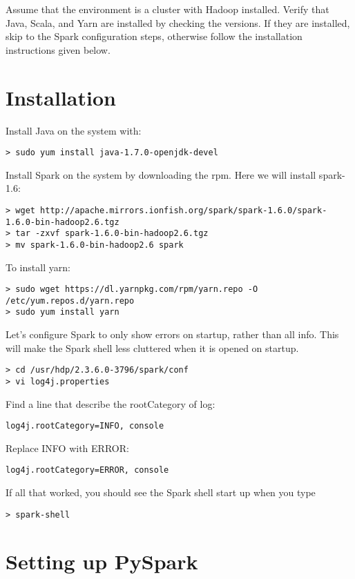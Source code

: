\documentclass[9pt,twocolumn,twoside]{idsi}
\begin{document}
Assume that the environment is a cluster with Hadoop installed. Verify that Java, Scala, and Yarn are installed by checking the versions. If they are installed, skip to the Spark configuration steps, otherwise follow the installation instructions given below.
\section{Installation}

\noindent
Install Java on the system with:
\begin{verbatim}
> sudo yum install java-1.7.0-openjdk-devel
\end{verbatim}

\noindent
Install Spark on the system by downloading the rpm. Here we will install spark-1.6:
\begin{lstlisting}[breaklines]
> wget http://apache.mirrors.ionfish.org/spark/spark-1.6.0/spark-1.6.0-bin-hadoop2.6.tgz
> tar -zxvf spark-1.6.0-bin-hadoop2.6.tgz
> mv spark-1.6.0-bin-hadoop2.6 spark
\end{lstlisting}

\noindent
To install yarn:
\begin{lstlisting}[breaklines]
> sudo wget https://dl.yarnpkg.com/rpm/yarn.repo -O /etc/yum.repos.d/yarn.repo
> sudo yum install yarn
\end{lstlisting}

\noindent
Let's configure Spark to only show errors on startup, rather than all info. This will make the Spark shell less cluttered when it is opened on startup.
\begin{verbatim}
> cd /usr/hdp/2.3.6.0-3796/spark/conf
> vi log4j.properties
\end{verbatim}

\noindent
Find a line that describe the rootCategory of log:
\begin{verbatim}
log4j.rootCategory=INFO, console
\end{verbatim}

Replace INFO with ERROR:
\begin{verbatim}
log4j.rootCategory=ERROR, console
\end{verbatim}

If all that worked, you should see the Spark shell start up when you type
\begin{verbatim}
> spark-shell
\end{verbatim}

\section{Setting up PySpark}
\end{document}
